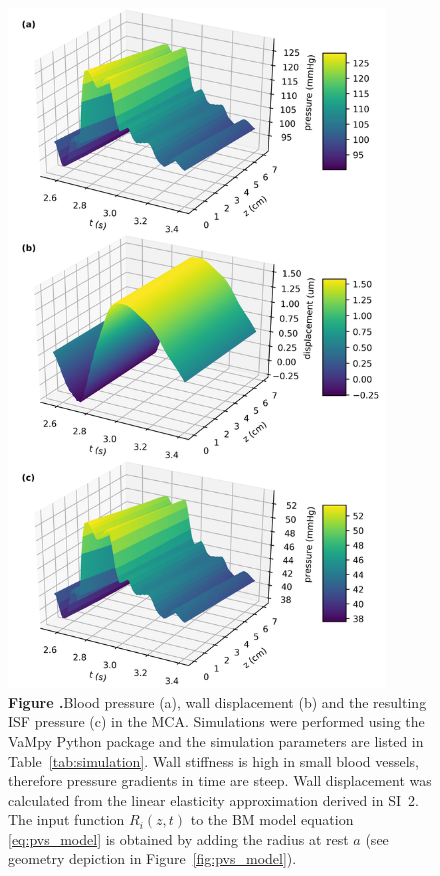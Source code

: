 \documentclass{frontiersFPHY} %
\begin{document}
\begin{figure}[h!]
\centering
\includegraphics[width=10cm]{figures/fig03.jpg}
\textbf{\label{fig:mca} Figure .}{Blood pressure (a), wall displacement (b) and the resulting ISF pressure (c) in the MCA. Simulations were performed using the VaMpy Python package \cite{Diem2016a} and the simulation parameters are listed in Table~\ref{tab:simulation}. Wall stiffness is high in small blood vessels, therefore pressure gradients in time are steep. Wall displacement was calculated from the linear elasticity approximation derived in SI~2. The input function $R_i(z,t)$ to the BM model equation \eqref{eq:pvs_model} is obtained by adding the radius at rest $a$ (see geometry depiction in Figure~\ref{fig:pvs_model}).}
\end{figure}
\end{document}
